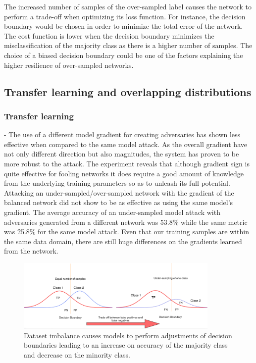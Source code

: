 \documentclass[runningheads,a4paper]{llncs}
\begin{document}
The increased number of samples of the over-sampled label causes the network to perform a trade-off when optimizing its loss function. For instance, the decision boundary would be chosen in order to minimize the total error of the network. The cost function is lower when the decision boundary minimizes the misclassification of the majority class as there is a higher number of samples. The choice of a biased decision boundary could be one of the factors explaining the higher resilience of over-sampled networks.

\subsection{Transfer learning and overlapping distributions}

\subsubsection{Transfer learning} - The use of a different model gradient for creating adversaries has shown less effective when compared to the same model attack. As the overall gradient have not only different direction but also magnitudes, the system has proven to be more robust to the attack. The experiment reveals that although gradient sign is quite effective for fooling networks it does require a good amount of knowledge from the underlying training parameters so as to unleash its full potential. Attacking an under-sampled/over-sampled network with the gradient of the balanced network did not show to be as effective as using the same model's gradient. The average accuracy of an under-sampled model attack with adversaries generated from a different network was 53.8\% while the same metric was 25.8\% for the same model attack. Even that our training samples are within the same data domain, there are still huge differences on the gradients learned from the network. 
\begin{figure}
	\centering
	\includegraphics[height=3.5cm]{class_dist.png}
	\caption{Dataset imbalance causes models to perform adjustments of decision boundaries leading to an increase on accuracy of the majority class and decrease on the minority class.}
	\label{fig:class_dist}
\end{figure}
\end{document}
